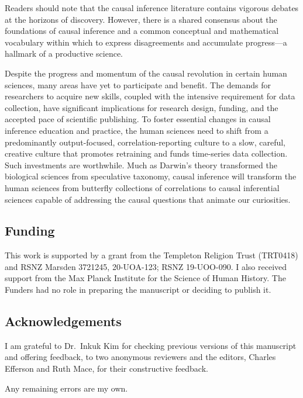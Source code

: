 \documentclass[
  single column]{article}
\begin{document}
Readers should note that the causal inference literature contains
vigorous debates at the horizons of discovery. However, there is a
shared consensus about the foundations of causal inference and a common
conceptual and mathematical vocabulary within which to express
disagreements and accumulate progress---a hallmark of a productive
science.

Despite the progress and momentum of the causal revolution in certain
human sciences, many areas have yet to participate and benefit. The
demands for researchers to acquire new skills, coupled with the
intensive requirement for data collection, have significant implications
for research design, funding, and the accepted pace of scientific
publishing. To foster essential changes in causal inference education
and practice, the human sciences need to shift from a predominantly
output-focused, correlation-reporting culture to a slow, careful,
creative culture that promotes retraining and funds time-series data
collection. Such investments are worthwhile. Much as Darwin's theory
transformed the biological sciences from speculative taxonomy, causal
inference will transform the human sciences from butterfly collections
of correlations to causal inferential sciences capable of addressing the
causal questions that animate our curiosities.

\newpage{}

\subsection{Funding}\label{funding}

This work is supported by a grant from the Templeton Religion Trust
(TRT0418) and RSNZ Marsden 3721245, 20-UOA-123; RSNZ 19-UOO-090. I also
received support from the Max Planck Institute for the Science of Human
History. The Funders had no role in preparing the manuscript or deciding
to publish it.

\subsection{Acknowledgements}\label{acknowledgements}

I am grateful to Dr.~Inkuk Kim for checking previous versions of this
manuscript and offering feedback, to two anonymous reviewers and the
editors, Charles Efferson and Ruth Mace, for their constructive
feedback.

Any remaining errors are my own.

\newpage{}
\end{document}

